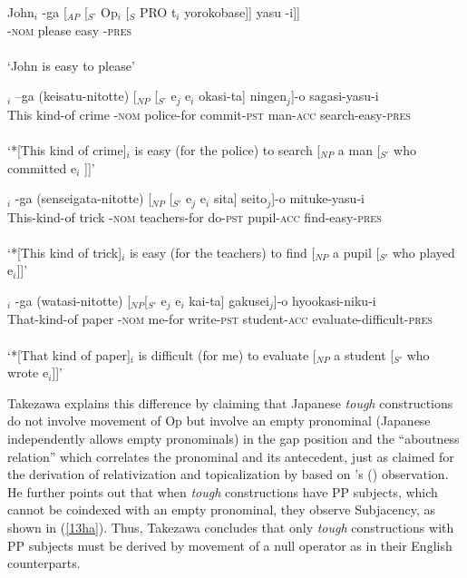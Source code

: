 \documentclass[output=paper,colorlinks,citecolor=brown,
]{langscibook}
\begin{document}
\begin{exe}
\ex \label{11ha}
\gll John$_{i}$ -ga [$_{AP}$ [$_{S’}$ Op$_{i}$ [$_{S}$ PRO t$_{i}$ yorokobase]] yasu -i]]\\
{} -\textsc{nom} {} {} {} {} {} {} please easy -\textsc{pres}\\\\
‘John is easy to please’

\ex \label{12ha}
\begin{xlist}
\ex \label{12aha}
$_{i}$ –ga (keisatu-nitotte) [$_{NP}$ [$_{S’}$ e$_{j}$ e$_{i}$ okasi-ta] ningen$_{j}$]-o  sagasi-yasu-i\\
This kind-of crime -\textsc{nom} police-for {} {} {} {} commit-\textsc{pst} man-\textsc{acc} search-easy-\textsc{pres}\\\\
`*[This kind of crime]$_{i}$ is easy (for the police) to search [$_{NP}$ a man [$_{S'}$ who committed e$_{i}$ ]]'

\ex \label{12bha}
$_{i}$ -ga (senseigata-nitotte) [$_{NP}$ [$_{S'}$ e$_{j}$ e$_{i}$ sita] seito$_{j}$]-o    mituke-yasu-i\\
This-kind-of trick -\textsc{nom} teachers-for {} {} {} {} do-\textsc{pst} pupil-\textsc{acc} find-easy-\textsc{pres}\\\\
 `*[This kind of trick]$_{i}$ is easy (for the teachers) to find [$_{NP}$ a pupil [$_{S'}$ who played e$_{i}$]]'



\ex \label{12cha}
$_{i}$ -ga (watasi-nitotte) [$_{NP}$[$_{S'}$ e$_{j}$ e$_{i}$ kai-ta] gakusei$_{j}$]-o  hyookasi-niku-i\\
That-kind-of paper  -\textsc{nom}  me-for  {} {} {}   write-\textsc{pst} student-\textsc{acc} evaluate-difficult-\textsc{pres}\\\\
`*[That kind of paper]$_{i}$ is difficult (for me) to evaluate [$_{NP}$ a student [$_{S'}$ who wrote e$_{i}$]]’ \hspace{30mm} \citep[203]{Takezawa1987}                   


\end{xlist}
\end{exe}

Takezawa explains this difference by claiming that Japanese \textit{tough} constructions do not involve movement of Op but involve an empty pronominal (Japanese independently allows empty pronominals) in the gap position and the “aboutness relation” which correlates the pronominal and its antecedent, just as claimed for the derivation of relativization and topicalization by \citet{Saito1985} based on \citeauthor{Kuno1973}’s (\citeyear{Kuno1973}) observation. He further points out that when \textit{tough} constructions have PP subjects, which cannot be coindexed with an empty pronominal, they observe Subjacency, as shown in (\ref{13ha}). Thus, Takezawa concludes that only \textit{tough} constructions with PP subjects must be derived by movement of a null operator as in their English counterparts.
\end{document}
